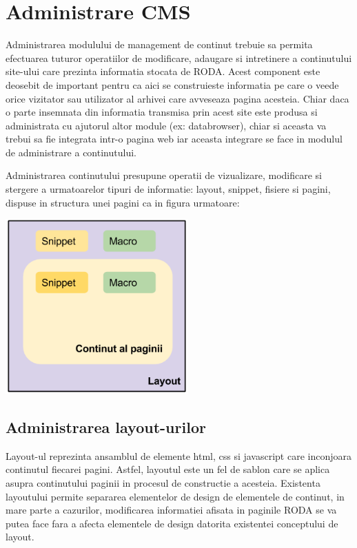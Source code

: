 \section{Administrare CMS}

Administrarea modulului de management de continut trebuie sa permita
efectuarea tuturor operatiilor de modificare, adaugare si intretinere
a continutului site-ului care prezinta informatia stocata de RODA.
Acest component este deosebit de important pentru ca aici se construieste
informatia pe care o veede orice vizitator sau utilizator al arhivei
care avveseaza pagina acesteia. Chiar daca o parte insemnata din informatia
transmisa prin acest site este produsa si administrata cu ajutorul
altor module (ex: databrowser), chiar si aceasta va trebui sa fie
integrata intr-o pagina web iar aceasta integrare se face in modulul
de administrare a continutului. 

Administrarea continutului presupune operatii de vizualizare, modificare
si stergere a urmatoarelor tipuri de informatie: layout, snippet,
fisiere si pagini, dispuse in structura unei pagini ca in figura urmatoare:

\includegraphics[width=7cm]{cms/roda-page}


\subsection{Administrarea layout-urilor}

Layout-ul reprezinta ansamblul de elemente html, css si javascript
care inconjoara continutul fiecarei pagini. Astfel, layoutul este
un fel de sablon care se aplica asupra continutului paginii in procesul
de constructie a acesteia. Existenta layoutului permite separarea
elementelor de design de elementele de continut, in mare parte a cazurilor,
modificarea informatiei afisata in paginile RODA se va putea face
fara a afecta elementele de design datorita existentei conceptului
de layout. 

